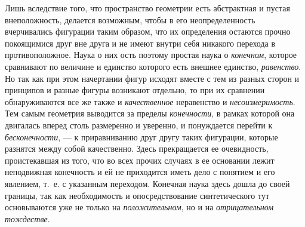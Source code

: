 \documentclass[twoside]{article}
\begin{document}
Лишь вследствие того, что пространство геометрии есть
абстрактная и пустая внеположность, делается возможным, чтобы в
его неопределенность вчерчивались фигурации таким образом,
что их определения остаются прочно покоящимися друг вне друга и не имеют
внутри себя никакого перехода в противоположное. Наука о них ость поэтому
простая наука о {\em конечном},
которое сравнивают по величине и единство которого есть
внешнее единство, {\em равенство}.
Но так как при этом начертании фигур исходят вместе с тем из
разных сторон и принципов и разные фигуры возникают отдельно, то при их
сравнении обнаруживаются все же также и
{\em качественное}
неравенство и
{\em несоизмеримость}.
Тем самым геометрия выводится за пределы
{\em конечности}, в
рамках которой она двигалась вперед столь размеренно и уверенно, и
понуждается перейти к
{\em бесконечности}, — к
приравниванию друг другу таких фигурации, которые разнятся между собой
качественно. Здесь прекращается ее очевидность, проистекавшая из того, что
во всех прочих случаях в ее основании лежит неподвижная конечность и ей не
приходится иметь дело с понятием и его явлением, т.~е. с указанным
переходом. Конечная наука здесь дошла до своей границы, так как
необходимость и опосредствование синтетического тут основываются уже не
только на {\em положительном}, но и на {\em отрицательном тождестве}.
\end{document}
